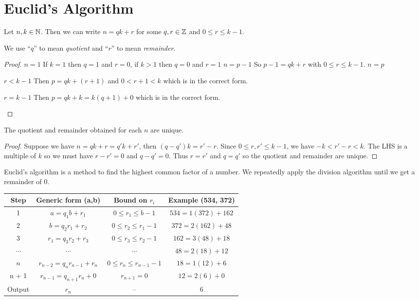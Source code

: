 \documentclass[../main.tex]{subfiles}
\begin{document}
\section{Euclid's Algorithm}
\begin{proposition}
  Let $n, k \in \mathbb{N}$.
  Then we can write $n = qk + r$ for some $q, r \in \mathbb{Z}$ and $0 \leq r \leq k - 1$.
\end{proposition}
\begin{remark}[Notation]
  We use ``$q$'' to mean \textit{quotient} and ``$r$'' to mean \textit{remainder}.
\end{remark}
\begin{proof}
  \induction
  {$n = 1$}{
    If $k = 1$ then $q = 1$ and $r = 0$, if $k > 1$ then $q = 0$ and $r = 1$
  }
  {$n = p - 1$}{
    So $p - 1= qk + r$ with $0 \leq r \leq k-1$.
  }
  {$n = p$}{
    \begin{proofcases}
      \begin{case}{$r < k - 1$}
        Then $p = qk + (r + 1)$ and $0 < r + 1 < k$ which is in the correct form.
      \end{case}
      \begin{case}{$r = k - 1$}
        Then $p = qk + k = k(q + 1) + 0$ which is in the correct form.
      \end{case}
    \end{proofcases}
  }
\end{proof}
\begin{remark}
  The quotient and remainder obtained for each $n$ are unique.
\end{remark}
\begin{proof}
  Suppose we have $n = qk + r = q' k + r'$, then $(q - q')k = r' - r$.
  Since $0 \leq r, r' \leq k -1$, we have $-k < r' - r < k$.
  The LHS is a multiple of $k$ so we must have $r - r' = 0$ and $q - q' = 0$.
  Thus $r = r'$ and $q = q'$ so the quotient and remainder are unique.
\end{proof}
Euclid's algorithm is a method to find the highest common factor of a number.
We repeatedly apply the division algorithm until we get a remainder of 0.
\begin{center}
\begin{tabular}{c|c|c|c}
  Step & Generic form (a,b) & Bound on $r_{i}$ & Example (534, 372) \\
\hline
1 & $a = q_1 b + r_1$ & $0 \leq r_1 \leq b-1$ & $534 = 1(372) + 162$ \\
2 & $b = q_2 r_1 + r_2$ & $0 \leq r_2 \leq r_1 - 1$ & $372 = 2(162) + 48$ \\
3 & $r_1 = q_3 r_2 + r_3$ & $0 \leq r_3 \leq r_2 - 1$ &$162 = 3(48) + 18$ \\
$\cdots$ & $\cdots$ & $\cdots$ &$48 = 2(18) + 12$ \\
$n$ & $r_{n-2} = q_n r_{n-1} + r_n$ & $0 \leq r_n \leq r_{n-1} - 1$&$18 = 1(12) + 6$ \\
n + 1 & $r_{n-1} = q_{n+1} r_n + 0$ & $r_{n + 1} = 0$ &$12 = 2(6) + 0$ \\
\hline
Output & $r_n$& -- & 6 \\
\end{tabular}
\end{center}
\end{document}
